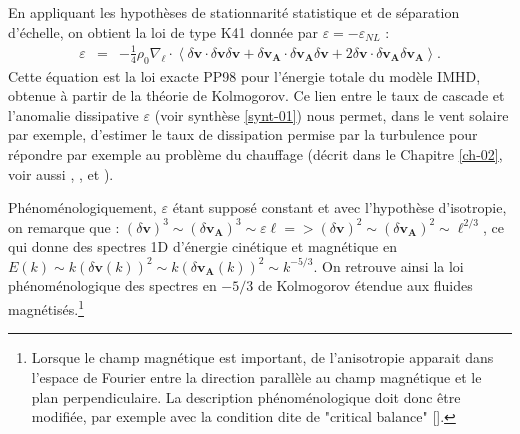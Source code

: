 En appliquant les hypothèses de stationnarité statistique et de séparation d'échelle, on obtient la loi de type K41 donnée par $\varepsilon = - \varepsilon_{NL}$ : 
\begin{eqnarray}
\label{eq:turb_inc_ELK}     \varepsilon &=& - \frac{1}{4} \rho_0 \nabla_{\boldsymbol{\ell}} \cdot \left< \delta \boldsymbol{v} \cdot \delta \boldsymbol{v} \delta \boldsymbol{v} + \delta \boldsymbol{v_A} \cdot \delta \boldsymbol{v_A} \delta \boldsymbol{v} + 2 \delta \boldsymbol{v} \cdot \delta \boldsymbol{v_A} \delta \boldsymbol{v_A}\right> .
\end{eqnarray}
Cette équation est la loi exacte \acs{PP98} pour l'énergie totale du modèle \acs{IMHD}, obtenue à partir de la théorie de Kolmogorov. Ce lien entre le taux de cascade et l'anomalie dissipative $\varepsilon$ (voir synthèse \ref{synt-01}) nous permet, dans le vent solaire par exemple, d'estimer le taux de dissipation permise par la turbulence pour répondre par exemple au problème du chauffage (décrit dans le Chapitre \ref{ch-02}, voir aussi \cite{smith_dependence_2006}, \cite{sorriso-valvo_observation_2007}, \cite{stawarz_turbulent_2009} et \cite{osman_proton_2013}). 

Phénoménologiquement, $\varepsilon$ étant supposé constant et avec l'hypothèse d'isotropie, on remarque que : $(\delta \boldsymbol{v})^3 \sim (\delta \boldsymbol{v_A})^3 \sim \varepsilon \ell => (\delta \boldsymbol{v})^2 \sim (\delta \boldsymbol{v_A})^2 \sim \ell^{2/3}$, ce qui donne des spectres \acs{1D} d'énergie cinétique et magnétique en $E(k) \sim k(\delta \boldsymbol{v}(k))^2  \sim k(\delta \boldsymbol{v_A}(k))^2  \sim k^{-5/3}$. On retrouve ainsi la loi phénoménologique des spectres en $-5/3$ de Kolmogorov étendue aux fluides magnétisés.\footnote{Lorsque le champ magnétique est important, de l'anisotropie apparait dans l'espace de Fourier entre la direction parallèle au champ magnétique et le plan perpendiculaire. La description phénoménologique doit donc être modifiée, par exemple avec la condition dite de "critical balance" [\cite{goldreich_toward_1995,horbury_anisotropic_2008}].}


